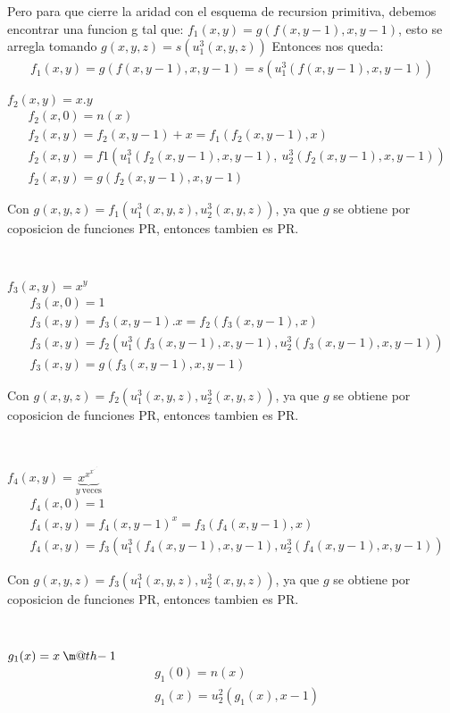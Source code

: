 \documentclass{report}
\makeatletter
\newcommand{\dotminus}{\mathbin{\text{\@dotminus}}}
\newcommand{\@dotminus}{%
  \ooalign{\hidewidth\raise1ex\hbox{.}\hidewidth\cr$\m@th-$\cr}%
}
\makeatother
\begin{document}
Pero para que cierre la aridad con el esquema de recursion primitiva, debemos encontrar una funcion g tal que:
$f_1(x,y) = g(f(x,y-1),x,y-1)$, esto se arregla tomando $g(x,y,z) = s(u_1^3(x,y,z))$
Entonces nos queda:
\begin{align}
	f_1(x,y) = g(f(x,y-1),x,y-1) = s(u_1^3(f(x,y-1),x,y-1))
\end{align}

\sol $f_{2}(x,y)=x.y$
\begin{align*}
	&f_{2}(x,0)=n(x) \\
	&f_2(x,y)=f_2(x,y-1)+x=f_1(f_2(x,y-1),x)\\
	&f_{2}(x,y)= f1(u_1^3(f_2(x,y-1),x,y-1),\ u_2^3(f_2(x,y-1),x,y-1))\\
	&f_{2}(x,y)= g(f_2(x,y-1),x,y-1)
\end{align*}

Con $g(x,y,z) = f_1(u_1^3(x,y,z),u_2^3(x,y,z))$, ya que $g$ se obtiene por coposicion de funciones PR, entonces tambien es PR.

~

\sol $f_{3}(x,y)=x^{y}$
\begin{align*}
	&f_{3}(x,0)=1\\
	&f_{3}(x,y)=f_{3}(x,y-1).x=f_{2}(f_{3}(x,y-1),x)\\
	&f_{3}(x,y)=f_{2}(u_{1}^{3}(f_{3}(x,y-1),x,y-1),u_{2}^{3}(f_{3}(x,y-1),x,y-1))\\
	&f_{3}(x,y)= g(f_3(x,y-1),x,y-1)
\end{align*}

Con $g(x,y,z) = f_2(u_1^3(x,y,z),u_2^3(x,y,z))$, ya que $g$ se obtiene por coposicion de funciones PR, entonces tambien es PR.

~

\sol 
$f_4(x,y)=\underbrace{x^{x^{x^{\cdot^{\cdot^{\cdot^{\cdot^{x}}}}}}}}_{y\ \text{veces}}$
\begin{align*}
	&f_{4}(x,0)=1\\
	&f_{4}(x,y)=f_{4}(x,y-1)^{x}=f_{3}(f_{4}(x,y-1),x)\\
	&f_{4}(x,y)=f_{3}(u_{1}^{3}(f_{4}(x,y-1),x,y-1),u_{2}^{3}(f_{4}(x,y-1),x,y-1))
\end{align*}

Con $g(x,y,z) = f_3(u_1^3(x,y,z),u_2^3(x,y,z))$, ya que $g$ se obtiene por coposicion de funciones PR, entonces tambien es PR.

~

\sol
$g_1(x)=x \dotminus 1$
\begin{align*}
	&g_{1}(0)=n(x)\\&g_{1}(x)=u_{2}^{2}(g_{1}(x),x-1)
\end{align*}
\end{document}
